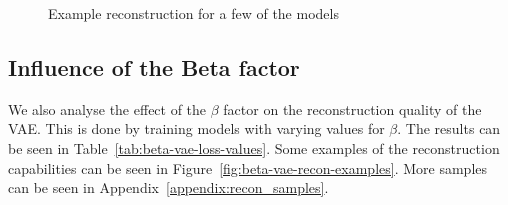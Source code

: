 \begin{figure}[!ht]
    \centering
    \caption{Example reconstruction for a few of the models}
    \label{fig:vae-backbones}
     \quad
\end{figure}


\subsection{Influence of the Beta factor}
We also analyse the effect of the $\beta$ factor on the reconstruction quality of the VAE. This is done by training models with varying values for $\beta$. The results can be seen in Table~\ref{tab:beta-vae-loss-values}. Some examples of the reconstruction capabilities can be seen in Figure~\ref{fig:beta-vae-recon-examples}. More samples can be seen in Appendix~\ref{appendix:recon_samples}.

